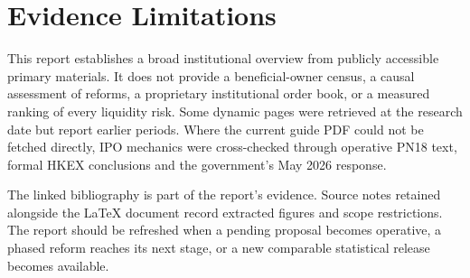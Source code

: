 \documentclass[11pt,a4paper]{article}
\begin{document}
\section{Evidence Limitations}
This report establishes a broad institutional overview from publicly accessible primary materials. It does not provide a beneficial-owner census, a causal assessment of reforms, a proprietary institutional order book, or a measured ranking of every liquidity risk. Some dynamic pages were retrieved at the research date but report earlier periods. Where the current guide PDF could not be fetched directly, IPO mechanics were cross-checked through operative PN18 text, formal HKEX conclusions and the government's May 2026 response.

The linked bibliography is part of the report's evidence. Source notes retained alongside the LaTeX document record extracted figures and scope restrictions. The report should be refreshed when a pending proposal becomes operative, a phased reform reaches its next stage, or a new comparable statistical release becomes available.

\clearpage
\end{document}
